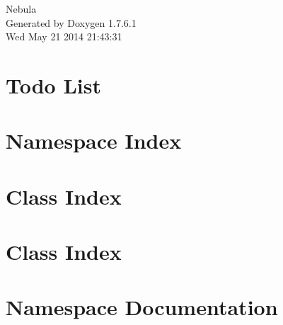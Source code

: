 \documentclass[a4paper]{book}
\begin{document}
\hypersetup{pageanchor=false,citecolor=blue}
\begin{titlepage}
\vspace*{7cm}
\begin{center}
{\Large \-Nebula }\\
\vspace*{1cm}
{\large \-Generated by Doxygen 1.7.6.1}\\
\vspace*{0.5cm}
{\small Wed May 21 2014 21:43:31}\\
\end{center}
\end{titlepage}
\clearemptydoublepage
{}
\tableofcontents
\clearemptydoublepage
{}
\hypersetup{pageanchor=true,citecolor=blue}
\chapter{\-Todo \-List}
\label{todo}
\hypertarget{todo}{}

\chapter{\-Namespace \-Index}

\chapter{\-Class \-Index}

\chapter{\-Class \-Index}

\chapter{\-Namespace \-Documentation}

























\end{document}
